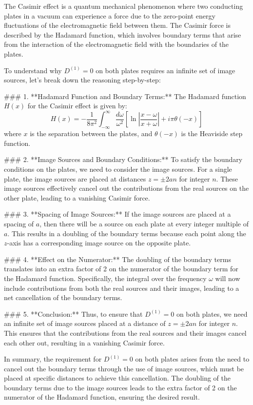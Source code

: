 The Casimir effect is a quantum mechanical phenomenon where two conducting plates in a vacuum can experience a force due to the zero-point energy fluctuations of the electromagnetic field between them. The Casimir force is described by the Hadamard function, which involves boundary terms that arise from the interaction of the electromagnetic field with the boundaries of the plates.

To understand why \( D^{(1)} = 0 \) on both plates requires an infinite set of image sources, let's break down the reasoning step-by-step:

### 1. **Hadamard Function and Boundary Terms:**
The Hadamard function \( H(x) \) for the Casimir effect is given by:
\[
H(x) = -\frac{1}{8\pi^2} \int_{-\infty}^{\infty} \frac{d\omega}{\omega^2} \left[ \ln \left| \frac{x - \omega}{x + \omega} \right| + i \pi \theta(-x) \right]
\]
where \( x \) is the separation between the plates, and \( \theta(-x) \) is the Heaviside step function.

### 2. **Image Sources and Boundary Conditions:**
To satisfy the boundary conditions on the plates, we need to consider the image sources. For a single plate, the image sources are placed at distances \( z = \pm 2an \) for integer \( n \). These image sources effectively cancel out the contributions from the real sources on the other plate, leading to a vanishing Casimir force.

### 3. **Spacing of Image Sources:**
If the image sources are placed at a spacing of \( a \), then there will be a source on each plate at every integer multiple of \( a \). This results in a doubling of the boundary terms because each point along the \( z \)-axis has a corresponding image source on the opposite plate.

### 4. **Effect on the Numerator:**
The doubling of the boundary terms translates into an extra factor of 2 on the numerator of the boundary term for the Hadamard function. Specifically, the integral over the frequency \( \omega \) will now include contributions from both the real sources and their images, leading to a net cancellation of the boundary terms.

### 5. **Conclusion:**
Thus, to ensure that \( D^{(1)} = 0 \) on both plates, we need an infinite set of image sources placed at a distance of \( z = \pm 2an \) for integer \( n \). This ensures that the contributions from the real sources and their images cancel each other out, resulting in a vanishing Casimir force.

In summary, the requirement for \( D^{(1)} = 0 \) on both plates arises from the need to cancel out the boundary terms through the use of image sources, which must be placed at specific distances to achieve this cancellation. The doubling of the boundary terms due to the image sources leads to the extra factor of 2 on the numerator of the Hadamard function, ensuring the desired result.